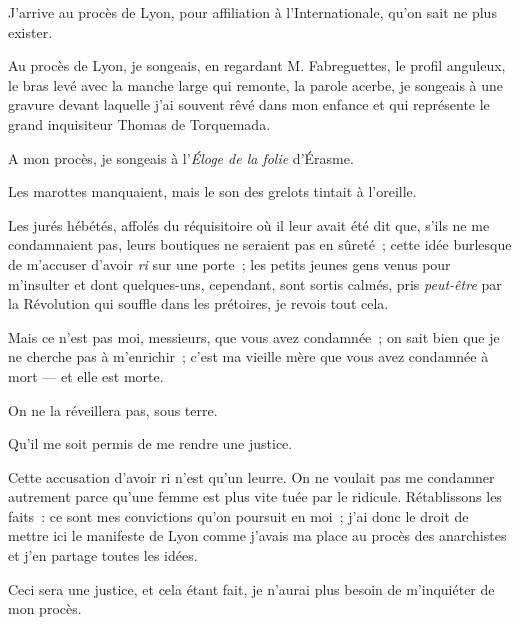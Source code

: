 \documentclass[french,twoside]{book} %
\newcommand{\astertri}{\medskip\par\centerline{\color{rubric}\large\selectfont{\syms ✻\,✻\,✻}}\medskip\par}%
\newcommand\chaptercont{} %
\begin{document}
\chaptercont
\noindent J’arrive au procès de Lyon, pour affiliation à l’Internationale, qu’on sait ne plus exister.\par
Au procès de Lyon, je songeais, en regardant M. Fabreguettes, le profil anguleux, le bras levé avec la manche large qui remonte, la parole acerbe, je songeais à une gravure devant laquelle j’ai souvent rêvé dans mon enfance et qui représente le grand inquisiteur Thomas de Torquemada.\par
A mon procès, je songeais à l’\emph{Éloge de la folie} d’Érasme.\par
Les marottes manquaient, mais le son des grelots tintait à l’oreille.\par
Les jurés hébétés, affolés du réquisitoire où il leur avait été dit que, s’ils ne me condamnaient pas, leurs boutiques ne seraient pas en sûreté ; cette idée burlesque de m’accuser d’avoir \emph{ri} sur une porte ; les petits jeunes gens venus pour m’insulter et dont quelques-uns, cependant,  sont sortis calmés, pris \emph{peut-être} par la Révolution qui souffle dans les prétoires, je revois tout cela.\par
Mais ce n’est pas moi, messieurs, que vous avez condamnée ; on sait bien que je ne cherche pas à m’enrichir ; c’est ma vieille mère que vous avez condamnée à mort — et elle est morte.\par
On ne la réveillera pas, sous terre.\par

\astertri

\noindent Qu’il me soit permis de me rendre une justice.\par
Cette accusation d’avoir ri n’est qu’un leurre. On ne voulait pas me condamner autrement parce qu’une femme est plus vite tuée par le ridicule. Rétablissons les faits : ce sont mes convictions qu’on poursuit en moi ; j’ai donc le droit de mettre ici le manifeste de Lyon comme j’avais ma place au procès des anarchistes et j’en partage toutes les idées.\par
Ceci sera une justice, et cela étant fait, je n’aurai plus besoin de m’inquiéter de mon procès.\par
\end{document}
